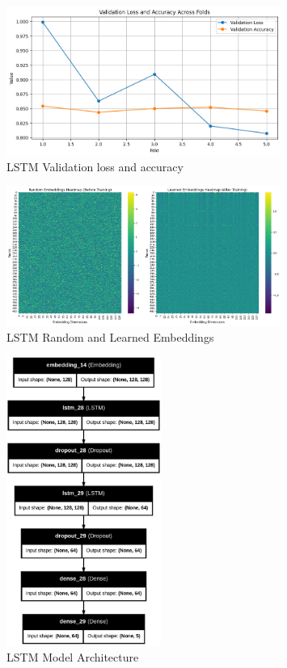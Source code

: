 \begin{figure}[h!]  
    \centering
    \includegraphics[width=0.8\textwidth]{Images/LSTM LA.png}  
    \caption{LSTM Validation loss and accuracy}
    \label{Accuracy Loss}  %
\end{figure}

\begin{figure}[h!]  
    \centering
    \includegraphics[width=0.8\textwidth]{Images/LSTM EMBED.png}  
    \caption{LSTM Random and Learned Embeddings}
    \label{lstm embed}  %
\end{figure}

\begin{figure}[h!]  
    \centering
    \includegraphics[width=0.45\textwidth]{Images/LSTM MODEL.png}  
    \caption{LSTM Model Architecture}
    \label{lstm arch}  %
\end{figure}

